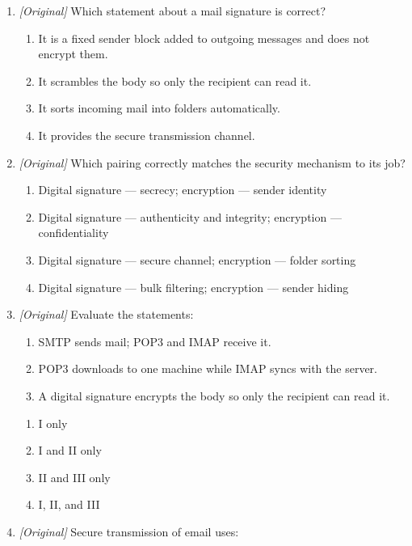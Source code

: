 \begin{enumerate}[label=\textbf{Q\arabic*.}, leftmargin=*]
\begin{enumerate}[label=\Alph*.]
  \end{enumerate}
\item \textit{[Original]} Which statement about a mail signature is correct?
  \begin{enumerate}[label=\Alph*.]
    \item It is a fixed sender block added to outgoing messages and does not encrypt them.
    \item It scrambles the body so only the recipient can read it.
    \item It sorts incoming mail into folders automatically.
    \item It provides the secure transmission channel.
  \end{enumerate}
\item \textit{[Original]} Which pairing correctly matches the security
  mechanism to its job?
  \begin{enumerate}[label=\Alph*.]
    \item Digital signature --- secrecy; encryption --- sender identity
    \item Digital signature --- authenticity and integrity; encryption --- confidentiality
    \item Digital signature --- secure channel; encryption --- folder sorting
    \item Digital signature --- bulk filtering; encryption --- sender hiding
  \end{enumerate}
\item \textit{[Original]} Evaluate the statements:
  \begin{enumerate}[label=\Roman*.]
    \item SMTP sends mail; POP3 and IMAP receive it.
    \item POP3 downloads to one machine while IMAP syncs with the server.
    \item A digital signature encrypts the body so only the recipient can read it.
  \end{enumerate}
  \begin{enumerate}[label=\Alph*.]
    \item I only
    \item I and II only
    \item II and III only
    \item I, II, and III
  \end{enumerate}
\item \textit{[Original]} Secure transmission of email uses:
  \begin{enumerate}[label=\Alph*.]

\end{enumerate}
\end{enumerate}
